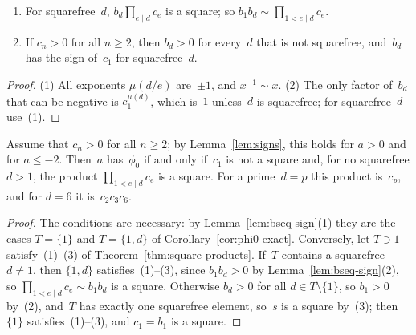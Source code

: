 \begin{lemma}
  \label{lem:bseq-sign}
  \leanok
  \begin{enumerate}
    \item For squarefree~$d$, $b_d \prod_{e \mid d} c_e$ is a square; so
          $b_1 b_d \sim \prod_{1 < e \mid d} c_e$.
    \item If $c_n > 0$ for all $n \ge 2$, then $b_d > 0$ for every~$d$ that is not squarefree,
          and~$b_d$ has the sign of~$c_1$ for squarefree~$d$.
  \end{enumerate}
\end{lemma}
\begin{proof}
  \leanok
  (1) All exponents $\mu(d/e)$ are~$\pm 1$, and $x^{-1} \sim x$. (2) The only factor of~$b_d$
  that can be negative is $c_1^{\mu(d)}$, which is~$1$ unless~$d$ is squarefree; for squarefree~$d$
  use~(1).
\end{proof}

\begin{corollary}
  \label{cor:phi0-pos}
  \leanok
  Assume that $c_n > 0$ for all $n \ge 2$; by Lemma~\ref{lem:signs}, this holds for $a > 0$ and
  for $a \le -2$. Then~$a$ has~$\phi_0$ if and only if~$c_1$ is not a square and, for no
  squarefree $d > 1$, the product $\prod_{1 < e \mid d} c_e$ is a square. For a prime~$d = p$
  this product is~$c_p$, and for $d = 6$ it is~$c_2 c_3 c_6$.
\end{corollary}
\begin{proof}
  \leanok
  The conditions are necessary: by Lemma~\ref{lem:bseq-sign}(1) they are the cases $T = \{1\}$
  and $T = \{1, d\}$ of Corollary~\ref{cor:phi0-exact}. Conversely, let $T \ni 1$
  satisfy~(1)--(3) of Theorem~\ref{thm:square-products}. If~$T$ contains a squarefree $d \ne 1$,
  then $\{1, d\}$ satisfies~(1)--(3), since $b_1 b_d > 0$ by Lemma~\ref{lem:bseq-sign}(2), so
  $\prod_{1 < e \mid d} c_e \sim b_1 b_d$ is a square. Otherwise $b_d > 0$ for all
  $d \in T \setminus \{1\}$, so $b_1 > 0$ by~(2), and~$T$ has exactly one squarefree element,
  so~$s$ is a square by~(3); then $\{1\}$ satisfies~(1)--(3), and $c_1 = b_1$ is a square.
\end{proof}

